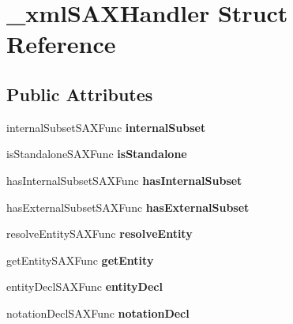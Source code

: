 \hypertarget{struct__xmlSAXHandler}{
\section{\_\-xmlSAXHandler Struct Reference}
\label{struct__xmlSAXHandler}
}
\subsection*{Public Attributes}
\begin{DoxyCompactItemize}
\item 
\hypertarget{struct__xmlSAXHandler_a7efae3be1f8af0e90820427744c26f48}{
internalSubsetSAXFunc {\bfseries internalSubset}}
\label{struct__xmlSAXHandler_a7efae3be1f8af0e90820427744c26f48}

\item 
\hypertarget{struct__xmlSAXHandler_aa5ee8d4a02fd4bde74c3be5dbfdf608e}{
isStandaloneSAXFunc {\bfseries isStandalone}}
\label{struct__xmlSAXHandler_aa5ee8d4a02fd4bde74c3be5dbfdf608e}

\item 
\hypertarget{struct__xmlSAXHandler_ab28d186ce3e3876ab981cc3b911f616b}{
hasInternalSubsetSAXFunc {\bfseries hasInternalSubset}}
\label{struct__xmlSAXHandler_ab28d186ce3e3876ab981cc3b911f616b}

\item 
\hypertarget{struct__xmlSAXHandler_a1a787a6a8c16f1229fe4efd525e93679}{
hasExternalSubsetSAXFunc {\bfseries hasExternalSubset}}
\label{struct__xmlSAXHandler_a1a787a6a8c16f1229fe4efd525e93679}

\item 
\hypertarget{struct__xmlSAXHandler_ac50c24e61236da8bae7730b8185208b8}{
resolveEntitySAXFunc {\bfseries resolveEntity}}
\label{struct__xmlSAXHandler_ac50c24e61236da8bae7730b8185208b8}

\item 
\hypertarget{struct__xmlSAXHandler_a2e52dd17ed7ee2bc5e85362759dc2cfa}{
getEntitySAXFunc {\bfseries getEntity}}
\label{struct__xmlSAXHandler_a2e52dd17ed7ee2bc5e85362759dc2cfa}

\item 
\hypertarget{struct__xmlSAXHandler_ae7be01c36f39914f1ce8373b02670ea3}{
entityDeclSAXFunc {\bfseries entityDecl}}
\label{struct__xmlSAXHandler_ae7be01c36f39914f1ce8373b02670ea3}

\item 
\hypertarget{struct__xmlSAXHandler_ab41d080edc929fc5e39fee869ae46837}{
notationDeclSAXFunc {\bfseries notationDecl}}
\label{struct__xmlSAXHandler_ab41d080edc929fc5e39fee869ae46837}


\end{DoxyCompactItemize}
